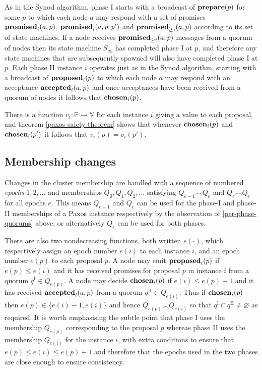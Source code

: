 \documentclass[journal]{IEEEtran}
\begin{document}
As in the Synod algorithm, phase I starts with a broadcast of $\mathbf{prepare}(p)$ for
some $p$ to which each node $a$ may respond with a set of promises
$\mathbf{promised}_{i}(a,p)$, $\mathbf{promised}_{i}(a,p;p')$ and $\mathbf{promised}_{\ge i}(a,p)$ according to its
set of state machines. If a node receives $\mathbf{promised}_{\ge i}(a,p)$ messages from a
quorum of nodes then its state machine $S_\infty$ has completed phase I at $p$,
and therefore any state machines that are subsequently spawned will also have
completed phase I at $p$. Each phase II instance $i$ operates just as in the
Synod algorithm, starting with a broadcast of $\mathbf{proposed}_{i}(p)$ to which each node
$a$ may respond with an acceptance $\mathbf{accepted}_{i}(a,p)$ and once acceptances have
been received from a quorum of nodes it follows that $\mathbf{chosen}_{i}(p)$.

There is a function $v_i : \mathbb P \to \mathbb V$ for each instance $i$
giving a value to each proposal, and theorem \ref{paxos-safety-theorem} shows
that whenever $\mathbf{chosen}_{i}(p)$ and $\mathbf{chosen}_{i}(p')$ it follows that $v_i(p) =
v_i(p')$.


\subsection{Membership changes}\label{membership-changes}

Changes in the cluster membership are handled with a sequence of numbered
\textit{epochs} $1, 2, \ldots$ and memberships $Q_0, Q_1, Q_2, \ldots$
satisfying $Q_{e-1} \frown Q_e$ and $Q_e \frown Q_e$ for all epochs $e$.  This
means $Q_{e-1}$ and $Q_e$ can be used for the phase-I and phase-II memberships
of a Paxos instance respectively by the observation of \ref{per-phase-quorums}
above, or alternatively $Q_e$ can be used for both phases.

There are also two nondecreasing functions, both written $e(\cdot)$, which
respectively assign an epoch number $e(i)$ to each instance $i$, and an epoch
number $e(p)$ to each proposal $p$. A node may emit $\mathbf{proposed}_{i}(p)$ if $e(p) \le
e(i)$ and it has received promises for proposal $p$ in instance $i$ from a
quorum $q^\textrm{I} \in Q_{e(p)}$. A node may decide $\mathbf{chosen}_{i}(p)$ if ${e(i)
\le e(p)+1}$ and it has received $\mathbf{accepted}_{i}(a,p)$ from a quorum ${q^\textrm{II}
\in Q_{e(i)}}$. Thus if $\mathbf{chosen}_{i}(p)$ then ${e(p) \in \{ e(i)-1, e(i) \}}$
and hence $Q_{e(p)} \frown Q_{e(i)}$ so that $q^\textrm{I} \cap q^\textrm{II}
\ne \varnothing$ as required. It is worth emphasising the subtle point that
phase I uses the membership $Q_{e(p)}$ corresponding to the proposal $p$
whereas phase II uses the membership $Q_{e(i)}$ for the instance $i$, with
extra conditions to ensure that $e(p) \le e(i) \le e(p) + 1$ and therefore that
the epochs used in the two phases are close enough to ensure consistency.
\end{document}

